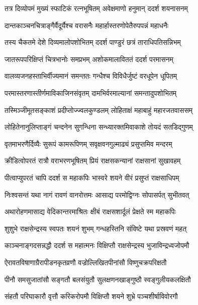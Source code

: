 
\twolineshloka
{तत्र दिव्योपमं मुख्यं स्फाटिकं रत्नभूषितम्}
{अवेक्षमाणो हनुमान् ददर्श शयनासनम्} %

\twolineshloka
{दान्तकाञ्चनचित्राङ्गैर्वैदूर्यैश्च वरासनैः}
{महार्हास्तरणोपेतैरुपपन्नं महाधनैः} %

\twolineshloka
{तस्य चैकतमे देशे दिव्यमालोपशोभितम्}
{ददर्श पाण्डुरं छत्रं ताराधिपतिसन्निभम्} %

\twolineshloka
{जातरूपपरिक्षिप्तं चित्रभानोः समप्रभम्}
{अशोकमालाविततं ददर्श परमासनम्} %

\twolineshloka
{वालव्यजनहस्ताभिर्वीज्यमानं समन्ततः}
{गन्धैश्च विविधैर्जुष्टं वरधूपेन धूपितम्} %

\twolineshloka
{परमास्तरणास्तीर्णमाविकाजिनसंवृतम्}
{दामभिर्वरमाल्यानां समन्तादुपशोभितम्} %

\twolineshloka
{तस्मिञ्जीमूतसङ्काशं प्रदीप्तोज्ज्वलकुण्डलम्}
{लोहिताक्षं महाबाहुं महारजतवाससम्} %

\twolineshloka
{लोहितेनानुलिप्ताङ्गं चन्दनेन सुगन्धिना}
{सन्ध्यारक्तमिवाकाशे तोयदं सतडिद्गुणम्} %

\twolineshloka
{वृतमाभरणैर्दिव्यैः सुरूपं कामरूपिणम्}
{सवृक्षवनगुल्माढ्यं प्रसुप्तमिव मन्दरम्} %

\twolineshloka
{क्रीडित्वोपरतं रात्रौ वराभरणभूषितम्}
{प्रियं राक्षसकन्यानां राक्षसानां सुखावहम्} %

\twolineshloka
{पीत्वाप्युपरतं चापि ददर्श स महाकपिः}
{भास्वरे शयने वीरं प्रसुप्तं राक्षसाधिपम्} %

\twolineshloka
{निःश्वसन्तं यथा नागं रावणं वानरोत्तमः}
{आसाद्य परमोद्विग्नः सोपासर्पत् सुभीतवत्} %

\twolineshloka
{अथारोहणमासाद्य वेदिकान्तरमाश्रितः}
{क्षीबं राक्षसशार्दूलं प्रेक्षते स्म महाकपिः} %

\twolineshloka
{शुशुभे राक्षसेन्द्रस्य स्वपतः शयनं शुभम्}
{गन्धहस्तिनि संविष्टे यथा प्रस्रवणं महत्} %

\twolineshloka
{काञ्चनाङ्गदसन्नद्धौ ददर्श स महात्मनः}
{विक्षिप्तौ राक्षसेन्द्रस्य भुजाविन्द्रध्वजोपमौ} %

\twolineshloka
{ऐरावतविषाणाग्रैरापीडनकृतव्रणौ}
{वज्रोल्लिखितपीनांसौ विष्णुचक्रपरिक्षतौ} %

\twolineshloka
{पीनौ समसुजातांसौ सङ्गतौ बलसंयुतौ}
{सुलक्षणनखाङ्गुष्ठौ स्वङ्गुलीयकलक्षितौ} %

\twolineshloka
{संहतौ परिघाकारौ वृत्तौ करिकरोपमौ}
{विक्षिप्तौ शयने शुभ्रे पञ्चशीर्षाविवोरगौ} %

